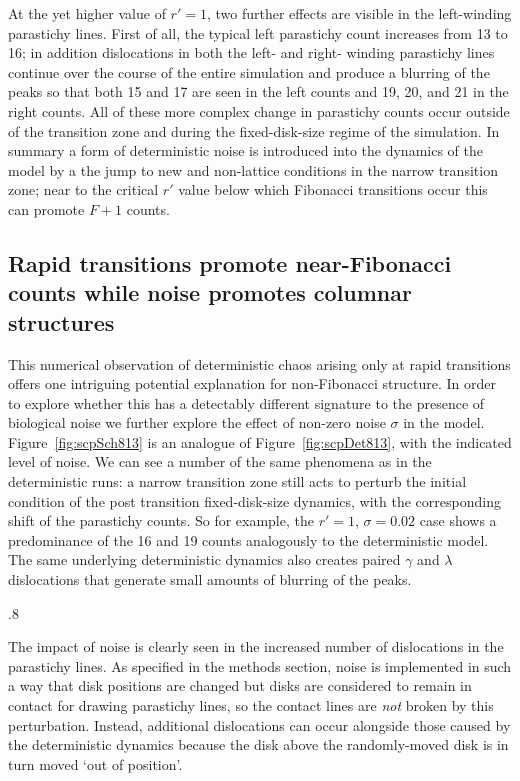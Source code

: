 At the yet higher value of $r'=1$, two further effects are visible in the left-winding parastichy lines. First of all,  the typical left parastichy count increases from 13 to 16; in addition dislocations in both the left- and right- winding parastichy lines continue over the  course of the entire simulation and produce a blurring of the peaks so that both 15 and 17 are seen in the left counts and 19, 20, and 21 in the right counts. All of these more complex change in parastichy counts occur outside of the transition zone and during the fixed-disk-size regime of the simulation.  In summary a form of deterministic noise is introduced into the dynamics of the model by a the jump to new and non-lattice conditions  in the narrow transition zone; near to the critical $r'$ value below which Fibonacci transitions occur this can promote $F+1$ counts.


\subsection{Rapid transitions promote near-Fibonacci counts while noise promotes columnar structures}
This numerical observation of deterministic chaos arising only at rapid transitions offers one intriguing potential explanation for non-Fibonacci structure. In order to explore whether this has a detectably different signature to the presence of biological noise we further explore the effect of non-zero noise $\sigma$ in the model.   
Figure~\ref{fig:scpSch813} is an analogue of Figure~\ref{fig:scpDet813},
 with the indicated level of noise.
We can see a number of the same phenomena as in the deterministic runs: a narrow transition zone still acts to perturb the initial condition of the post transition fixed-disk-size dynamics, with the corresponding shift of the parastichy counts. So for example, the $r'=1$, $\sigma=0.02$ case shows a predominance of the 16 and 19 counts analogously to the deterministic model. The same underlying deterministic dynamics also creates paired $\gamma$ and $\lambda$ dislocations that generate small amounts of blurring of the peaks.
 
 {.8}

The impact of noise is clearly seen in the increased number of dislocations in the parastichy lines. As specified in the methods section,  noise is implemented in such a way that disk positions are changed but disks are considered to remain in contact for drawing parastichy lines, so the contact lines are \textit{not} broken by this perturbation. Instead, additional dislocations can occur alongside those caused by the deterministic dynamics because the disk above the randomly-moved disk is in turn moved `out of position'. 

